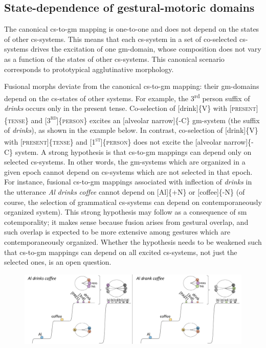 \subsection{State-dependence of gestural-motoric domains}

The canonical cs-to-gm mapping is one-to-one and does not depend on the states of other cs-systems. This means that each cs-system in a set of co-selected cs-systems drives the excitation of one gm-domain, whose composition does not vary as a function of the states of other cs-systems. This canonical scenario corresponds to prototypical agglutinative morphology. 

  Fusional morphs deviate from the canonical cs-to-gm mapping: their gm-domains depend on the cs-states of other systems. For example, the 3\textsuperscript{rd} person suffix of \textit{drinks} occurs only in the present tense. Co-selection of [drink]\{V\} with [\textsc{present}]\{\textsc{tense}\} and [\textsc{3}\textsc{\textsuperscript{rd}}]\{\textsc{person}\} excites an [alveolar narrow]\{-C\} gm-system (the suffix of \textit{drinks}), as shown in the example below. In contrast, co-selection of [drink]\{V\} with [\textsc{present]}\{\textsc{tense}\} and [\textsc{1}\textsc{\textsuperscript{st}}]\{\textsc{person}\} does not excite the [alveolar narrow]\{-C\} system. A strong hypothesis is that cs-to-gm mappings can depend only on selected cs-systems. In other words, the gm-systems which are organized in a given epoch cannot depend on cs-systems which are not selected in that epoch. For instance, fusional cs-to-gm mappings associated with inflection of \textit{drinks} in the utterance \textit{Al} \textit{drinks} \textit{coffee} cannot depend on [Al]\{+N\} or [coffee]\{-N\} (of course, the selection of grammatical cs-systems can depend on contemporaneously organized system). This strong hypothesis may follow as a consequence of sm cotemporality; it makes sense because fusion arises from gestural overlap, and such overlap is expected to be more extensive among gestures which are contemporaneously organized. Whether the hypothesis needs to be weakened such that cs-to-gm mappings can depend on all excited cs-systems, not just the selected ones, is an open question.

  
\begin{figure}
\includegraphics[width=\textwidth]{figures/Tilsen-img69.png}
\caption{\missingcaption}
\label{fig:}
\end{figure}
 

